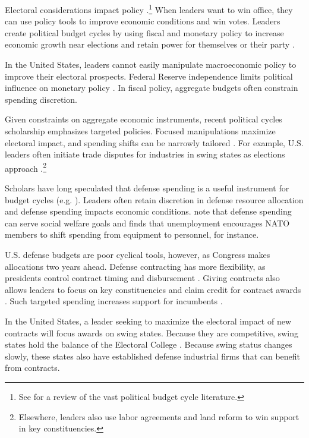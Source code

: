 \documentclass[12pt]{article}
\begin{document}
Electoral considerations impact policy \citep{Nordhaus1975}.\footnote{See \citet{Dubois2016} for a review of the vast political budget cycle literature.} 
When leaders want to win office, they can use policy tools to improve economic conditions and win votes. 
Leaders create political budget cycles by using fiscal and monetary policy to increase economic growth near elections and retain power for themselves or their party \citep{Tufte1978, Rogoff1987}. 


In the United States, leaders cannot easily manipulate macroeconomic policy to improve their electoral prospects.  
Federal Reserve independence limits political influence on monetary policy \citep{ClarkHallerberg2000}. 
In fiscal policy, aggregate budgets often constrain spending discretion.


Given constraints on aggregate economic instruments, recent political cycles scholarship emphasizes targeted policies.
Focused manipulations maximize electoral impact, and spending shifts can be narrowly tailored \citep[pg. 248]{Dubois2016}.
For example, U.S. leaders often initiate trade disputes for industries in swing states as elections approach \citep{Conconietal2017}.\footnote{Elsewhere, leaders also use labor agreements \citep{Ahlquist2010} and land reform \citep{Philips2020} to win support in key constituencies.} 


Scholars have long speculated that defense spending is a useful instrument for budget cycles (e.g. \cite{Tufte1978, Mintz1988}).
Leaders often retain discretion in defense resource allocation and defense spending impacts economic conditions.
\citet{WhittenWilliams2011} note that defense spending can serve social welfare goals and \citet{Becker2021} finds that unemployment encourages NATO members to shift spending from equipment to personnel, for instance.


U.S. defense budgets are poor cyclical tools, however, as Congress makes allocations two years ahead.
Defense contracting has more flexibility, as presidents control contract timing and disbursement \citep{Mayer1995, DerouenHeo2000}.
Giving contracts also allows leaders to focus on key constituencies and claim credit for contract awards \citep{DerouenHeo2000}. 
Such targeted spending increases support for incumbents \citep{KrinerReeves2012}.


In the United States, a leader seeking to maximize the electoral impact of new contracts will focus awards on swing states.
Because they are competitive, swing states hold the balance of the Electoral College \citep{KrinerReeves2015}. 
Because swing status changes slowly, these states also have established defense industrial firms that can benefit from contracts. 
\end{document}
